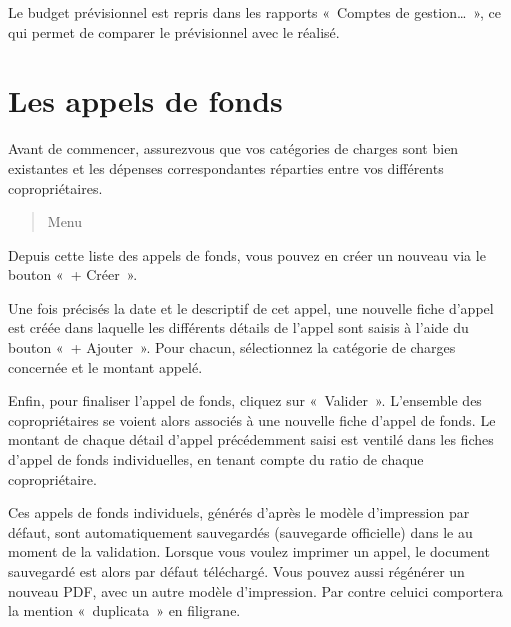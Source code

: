 \documentclass[a4paper,10pt,oneside,french]{sphinxmanual}
\begin{document}
\sphinxAtStartPar
Le budget prévisionnel est repris dans les rapports « Comptes de gestion… », ce qui permet de comparer le prévisionnel avec le réalisé.


\section{Les appels de fonds}
\label{\detokenize{condominium/call_of_funds:les-appels-de-fonds}}\label{\detokenize{condominium/call_of_funds::doc}}
\sphinxAtStartPar
Avant de commencer, assurez\sphinxhyphen{}vous que vos catégories de charges sont bien existantes et les dépenses correspondantes réparties entre vos différents copropriétaires.
\begin{quote}

\sphinxAtStartPar
Menu 
\end{quote}

\sphinxAtStartPar
Depuis cette liste des appels de fonds, vous pouvez en créer un nouveau via le bouton « + Créer ».

\sphinxAtStartPar
Une fois précisés la date et le descriptif de cet appel, une nouvelle fiche d’appel est créée dans laquelle les différents détails de l’appel sont saisis à l’aide du bouton « + Ajouter ». Pour chacun, sélectionnez la catégorie de charges concernée et le montant appelé.
\begin{quote}

\noindent{}
\end{quote}

\sphinxAtStartPar
Enfin, pour finaliser l’appel de fonds, cliquez sur « Valider ».
L’ensemble des copropriétaires se voient alors associés à une nouvelle fiche d’appel de fonds.
Le montant de chaque détail d’appel précédemment saisi est ventilé dans les fiches d’appel de fonds individuelles, en tenant compte du ratio de chaque copropriétaire.

\sphinxAtStartPar
Ces appels de fonds individuels, générés d’après le modèle d’impression par défaut, sont automatiquement sauvegardés (sauvegarde officielle) dans le  au moment de la validation.
Lorsque vous voulez imprimer un appel, le document sauvegardé est alors par défaut téléchargé.
Vous pouvez aussi régénérer un nouveau PDF, avec un autre modèle d’impression. Par contre celui\sphinxhyphen{}ci comportera la mention « duplicata » en filigrane.
\end{document}
